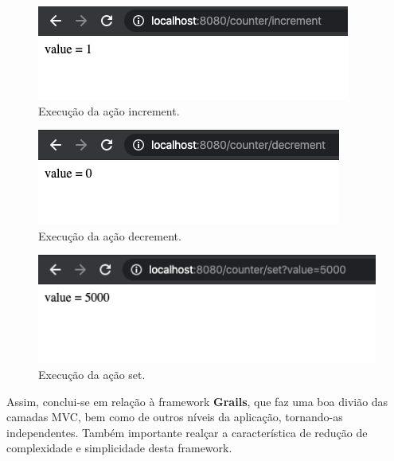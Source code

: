 \begin{figure}[H]
    \centering
    \includegraphics[scale=0.50]{images/g-2.png}
    \caption{Execução da ação increment.}
    \label{fig:g-2}
\end{figure}

\begin{figure}[H]
    \centering
    \includegraphics[scale=0.50]{images/g-3.png}
    \caption{Execução da ação decrement.}
    \label{fig:g-3}
\end{figure}

\begin{figure}[H]
    \centering
    \includegraphics[scale=0.50]{images/g-4.png}
    \caption{Execução da ação set.}
    \label{fig:g-4}
\end{figure}

\hspace{5mm} Assim, conclui-se em relação à framework \textbf{Grails}, que faz uma boa divião das camadas MVC, bem como de outros níveis da aplicação, tornando-as independentes. Também importante realçar a característica de redução de complexidade e simplicidade desta framework.





